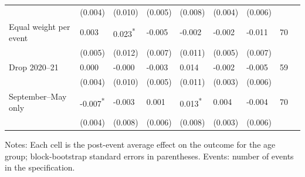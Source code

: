 \documentclass[12pt]{article}
\begin{document}
\begin{table}
\begin{tabular}{p{}p{}p{}p{}p{}p{}p{}p{}p{}}
 & (0.004) & (0.010) & (0.005) & (0.008) & (0.004) & (0.006) &  \\
Equal weight per event & 0.003 & 0.023\textsuperscript{*} & -0.005 & -0.002 & -0.002 & -0.011 & 70 \\
 & (0.005) & (0.012) & (0.007) & (0.011) & (0.005) & (0.007) &  \\
Drop 2020--21 & 0.000 & -0.000 & -0.003 & 0.014 & -0.002 & -0.005 & 59 \\
 & (0.004) & (0.010) & (0.005) & (0.011) & (0.003) & (0.006) &  \\
September--May only & -0.007\textsuperscript{*} & -0.003 & 0.001 & 0.013\textsuperscript{*} & 0.004 & -0.004 & 70 \\
 & (0.004) & (0.008) & (0.006) & (0.008) & (0.003) & (0.006) &  \\
\bottomrule
\end{tabular}



\noindent\small Notes: Each cell is the post-event average effect on the outcome for the age group; block-bootstrap standard errors in parentheses. Events: number of events in the specification.

\end{table}
\end{document}
